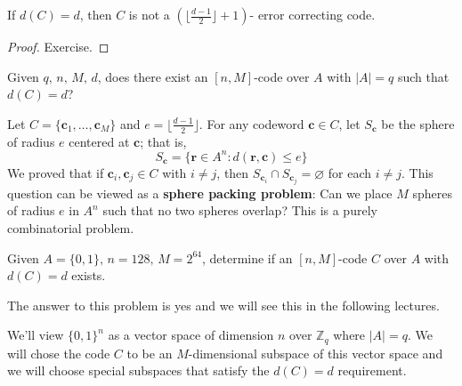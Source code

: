 \begin{thmbox}
    \begin{theorem}
    If $ d(C)=d $, then $ C $ is not a $ \left( \lfloor \frac{d-1}{2}\rfloor +1 \right) $-
    error correcting code.
\end{theorem} \end{thmbox}

\begin{proof}
    Exercise.
\end{proof}

Given $ q,\,n,\,M,\,d $, does there exist an $ [n,M] $-code over $ A $
with $ |A|=q $ such that $ d(C)=d $?

Let $ C=\{\bm{c}_1,\ldots ,\bm{c}_M\} $ and $ e=\lfloor \frac{d-1}{2} \rfloor $.
For any codeword $ \bm{c}\in C $, let $ S_{\bm{c}} $ be the sphere of radius $ e $ centered at
$ \bm{c} $;
that is,
\[ S_{\bm{c}}= \{\bm{r}\in A^n:d(\bm{r},\bm{c})\leqslant e\} \]
We proved that if $ \bm{c}_i,\bm{c}_j\in C $ with $ i\neq j $,
then $ S_{\bm{c}_i}\cap S_{\bm{c}_j}= \varnothing $ for each $ i\neq j $.
This question can be viewed as a \textbf{sphere packing problem}:
Can we place $ M $ spheres of radius $ e $ in $ A^n $ such that
no two spheres overlap? This is a purely combinatorial problem.

Given $ A=\{0,1\},\,n=128,\,M=2^{64} $, determine
if an $ [n,M] $-code $ C $ over $ A $ with $ d(C)=d $ exists.

The answer to this problem is yes and we will see this in the following lectures.

 We'll view $ \{0,1\}^{n} $ as a vector space of
dimension $ n $ over $ \mathbb{Z}_q $ where $ |A|=q $. We will chose the code
$ C $ to be an $ M $-dimensional subspace of this vector space
and we will choose special subspaces that satisfy the $ d(C)=d $ requirement.
